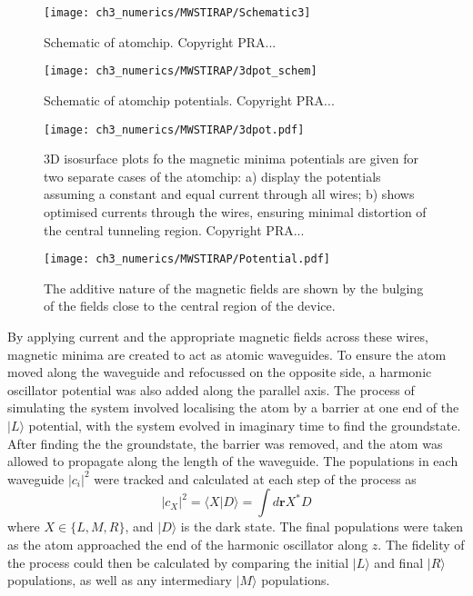 \begin{figure}[tb]
    \centering
  \texttt{[image: ch3\_numerics/MWSTIRAP/Schematic3]}
  \caption{Schematic of atomchip. Copyright PRA...}
  \label{fig:schematic_atomchip}
\end{figure}
\begin{figure}[tb]
    \centering
  \texttt{[image: ch3\_numerics/MWSTIRAP/3dpot\_schem]}
  \caption{Schematic of atomchip potentials. Copyright PRA...}
  \label{fig:potschematic}
\end{figure}

\begin{figure}[tb]
    \centering
  \texttt{[image: ch3\_numerics/MWSTIRAP/3dpot.pdf]}
  \caption[Simulated 3D potentials for the atomchip device]{3D isosurface plots fo the magnetic minima potentials are given for two separate cases of the atomchip: a) display the potentials assuming a constant and equal current through all wires; b) shows optimised currents through the wires, ensuring minimal distortion of the central tunneling region. Copyright PRA...}
  \label{fig:mag_min_3d}
\end{figure}

\begin{figure}[tb]
    \centering
  \texttt{[image: ch3\_numerics/MWSTIRAP/Potential.pdf]}
  \caption[Isosurface of the magnetic fields.]{The additive nature of the magnetic fields are shown by the bulging of the fields close to the central region of the device.}
  \label{fig:mag_max_3d}
\end{figure}


By applying current and the appropriate magnetic fields across these wires, magnetic minima are created to act as atomic waveguides. To ensure the atom moved along the waveguide and refocussed on the opposite side, a harmonic oscillator potential was also added along the parallel axis. The process of simulating the system involved localising the atom by a barrier at one end of the $|L\rangle$ potential, with the system evolved in imaginary time to find the groundstate. After finding the the groundstate, the barrier was removed, and the atom was allowed to propagate along the length of the waveguide. The populations in each waveguide $|c_{i}|^2$ were tracked and calculated at each step of the process as
\begin{equation}
    |c_X|^2 = \langle X | D \rangle = \int d\mathbf{r} X^{*} D
\end{equation}
where $X \in \{L,M,R\}$, and $| D \rangle$ is the dark state.
The final populations were taken as the atom approached the end of the harmonic oscillator along $z$. The fidelity of the process could then be calculated by comparing the initial $| L \rangle$ and final $|R \rangle$ populations, as well as any intermediary $| M \rangle$ populations.

